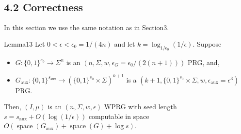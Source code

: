 \subsection*{4.2 Correctness}
In this section we use the same notation as in Section3.
\begin{authorclaim}{Lemma13}
Let $0<\epsilon<\epsilon_0=1/(4n)$ and let $k=\log_{1/\epsilon_0}(1/\epsilon)$. Suppose
\begin{itemize}
\item $G:\{0,1\}^{s_0}\to\Sigma^n$ is an $(n,\Sigma,w,\epsilon_G=\epsilon_0/(2(n+1)))$ PRG, and,
\item $G_{\mathrm{aux}}:\{0,1\}^{s_{\mathrm{aux}}}\to(\{0,1\}^{s_0}\times\Sigma)^{k+1}$ is a $(k+1,\{0,1\}^{s_0}\times\Sigma,w,\epsilon_{\mathrm{aux}}=\epsilon^3)$ PRG.
\end{itemize}
Then, $(I,\mu)$ is an $(n,\Sigma,w,\epsilon)$ WPRG with seed length $s=s_{\mathrm{aux}}+O(\log(1/\epsilon))$ computable in space $O(\operatorname{space}(G_{\mathrm{aux}})+\operatorname{space}(G)+\log s)$.
\end{authorclaim}
